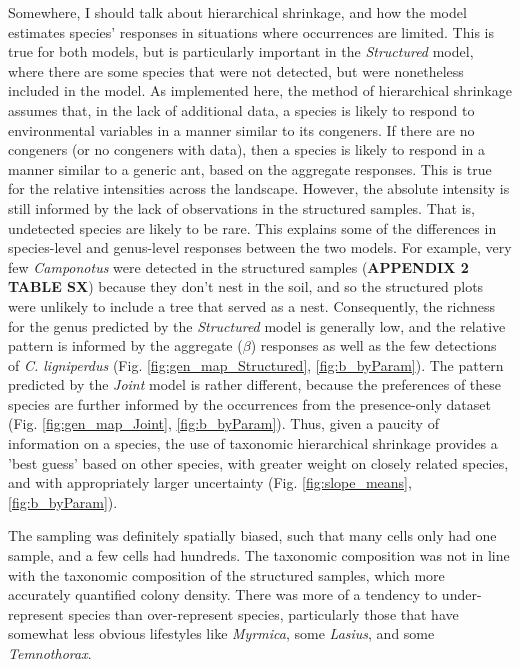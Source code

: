 \documentclass[preprint,review,times,12pt]{elsarticle}
\begin{document}
Somewhere, I should talk about hierarchical shrinkage, and how the model estimates species' responses in situations where occurrences are limited. This is true for both models, but is particularly important in the \emph{Structured} model, where there are some species that were not detected, but were nonetheless included in the model. As implemented here, the method of hierarchical shrinkage assumes that, in the lack of additional data, a species is likely to respond to environmental variables in a manner similar to its congeners. If there are no congeners (or no congeners with data), then a species is likely to respond in a manner similar to a generic ant, based on the aggregate responses. This is true for the relative intensities across the landscape. However, the absolute intensity is still informed by the lack of observations in the structured samples. That is, undetected species are likely to be rare. This explains some of the differences in species-level and genus-level responses between the two models. For example, very few \emph{Camponotus} were detected in the structured samples (\textbf{APPENDIX 2 TABLE SX}) because they don't nest in the soil, and so the structured plots were unlikely to include a tree that served as a nest. Consequently, the richness for the genus predicted by the \emph{Structured} model is generally low, and the relative pattern is informed by the aggregate ($\beta$) responses as well as the few detections of \emph{C. ligniperdus} (Fig. \ref{fig:gen_map_Structured}, \ref{fig:b_byParam}). The pattern predicted by the \emph{Joint} model is rather different, because the preferences of these species are further informed by the occurrences from the presence-only dataset (Fig. \ref{fig:gen_map_Joint}, \ref{fig:b_byParam}). Thus, given a paucity of information on a species, the use of taxonomic hierarchical shrinkage provides a 'best guess' based on other species, with greater weight on closely related species, and with appropriately larger uncertainty (Fig. \ref{fig:slope_means}, \ref{fig:b_byParam}).

The sampling was definitely spatially biased, such that many cells only had one sample, and a few cells had hundreds. The taxonomic composition was not in line with the taxonomic composition of the structured samples, which more accurately quantified colony density. There was more of a tendency to under-represent species than over-represent species, particularly those that have somewhat less obvious lifestyles like \emph{Myrmica}, some \emph{Lasius}, and some \emph{Temnothorax}.  
\end{document}
